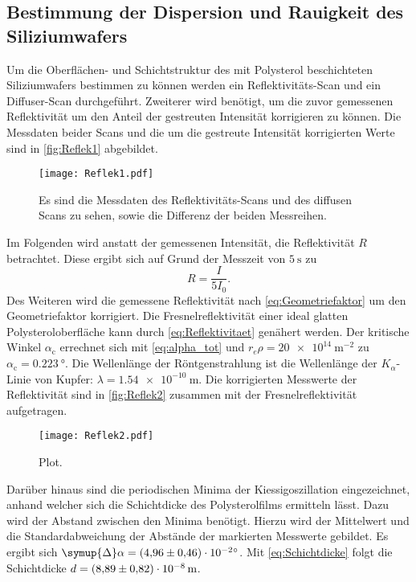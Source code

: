 \subsection{Bestimmung der Dispersion und Rauigkeit des Siliziumwafers}
Um die Oberflächen- und Schichtstruktur des mit Polysterol beschichteten Siliziumwafers bestimmen zu können werden ein Reflektivitäts-Scan und ein Diffuser-Scan durchgeführt.
Zweiterer wird benötigt, um die zuvor gemessenen Reflektivität um den Anteil der gestreuten Intensität korrigieren zu können. Die Messdaten beider Scans und die um die gestreute 
Intensität korrigierten Werte sind in \autoref{fig:Reflek1} abgebildet.
\begin{figure}
  \centering
  \texttt{[image: Reflek1.pdf]}
  \caption{Es sind die Messdaten des Reflektivitäts-Scans und des diffusen Scans zu sehen, sowie die Differenz der beiden Messreihen.}
  \label{fig:Reflek1}
\end{figure}
Im Folgenden wird anstatt der gemessenen Intensität, die Reflektivität $R$ betrachtet. Diese ergibt sich auf Grund der Messzeit von $\qty{5}{\second}$ zu 
\begin{equation*}
  R = \frac{I}{5I_0}.
\end{equation*}
Des Weiteren wird die gemessene Reflektivität nach \autoref{eq:Geometriefaktor} um den Geometriefaktor korrigiert.
Die Fresnelreflektivität einer ideal glatten Polysteroloberfläche kann durch \autoref{eq:Reflektivitaet} genähert werden. Der kritische Winkel $\alpha_\text{c}$ errechnet sich mit
\autoref{eq:alpha_tot} und $r_e\rho = \qty{20e14}{\metre^{-2}}$ \cite{V44} zu $\alpha_\text{c} = \qty{0.223}{\degree}$. Die Wellenlänge der Röntgenstrahlung ist die 
Wellenlänge der $K_\alpha$-Linie von Kupfer: $\lambda = \qty{1.54e-10}{\metre}$.
Die korrigierten Messwerte der Reflektivität sind in \autoref{fig:Reflek2} zusammen mit der Fresnelreflektivität aufgetragen.
\begin{figure}
  \centering
  \texttt{[image: Reflek2.pdf]}
  \caption{Plot.}
  \label{fig:Reflek2}
\end{figure}
Darüber hinaus sind die periodischen Minima der Kiessigoszillation eingezeichnet, anhand welcher sich die Schichtdicke des Polysterolfilms ermitteln lässt.
Dazu wird der Abstand zwischen den Minima benötigt. Hierzu wird der Mittelwert und die Standardabweichung der Abstände der markierten Messwerte gebildet. Es ergibt sich 
$\symup{\Delta}\alpha = \qty{4.96 +- 0.46e-2}{\degree}$. Mit \autoref{eq:Schichtdicke} folgt die Schichtdicke $d = \qty{8.89 +- 0.82e-8}{\metre}$.


